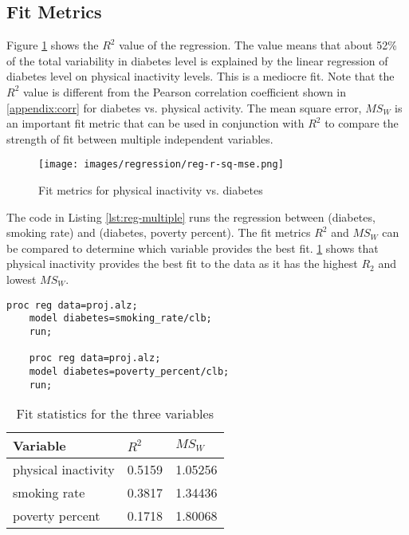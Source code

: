 \documentclass{article}
\begin{document}
\subsection{Fit Metrics}
Figure \ref{fig:reg-r-sq} shows the $R^2$ value of the regression. The value means that about 52\% of the total variability in diabetes level is explained by the linear regression of diabetes level on physical inactivity levels. This is a mediocre fit. Note that the $R^2$ value is different from the Pearson correlation coefficient shown in \ref{appendix:corr} for diabetes vs. physical activity. The mean square error, $MS_W$ is an important fit metric that can be used in conjunction with $R^2$ to compare the strength of fit between multiple independent variables.

\begin{figure}[ht]
    \centering
    \texttt{[image: images/regression/reg-r-sq-mse.png]}
    \caption{Fit metrics for physical inactivity vs. diabetes}
    \label{fig:reg-r-sq}
\end{figure}

The code in Listing \ref{lst:reg-multiple} runs the regression between (diabetes, smoking rate) and (diabetes, poverty percent). The fit metrics $R^2$ and $MS_W$ can be compared to determine which variable provides the best fit. \ref{tab:reg-multiple} shows that physical inactivity provides the best fit to the data as it has the highest $R_2$ and lowest $MS_W$. 

\begin{lstlisting}[language=SAS,caption=Linear regression SAS program for additional variables,captionpos=b,label=lst:reg-multiple]
    proc reg data=proj.alz;
    model diabetes=smoking_rate/clb;
    run;
    
    proc reg data=proj.alz;
    model diabetes=poverty_percent/clb;
    run;
\end{lstlisting}


\begin{table}[ht]
    \centering
    \begin{tabular}{|l|l|l|}
    \hline
         Variable & $R^2$  & $MS_W$ \\
         \hline
         physical inactivity& 0.5159  & 1.05256 \\
         \hline
         smoking rate & 	0.3817  & 1.34436 \\
         \hline
         poverty percent & 0.1718  & 1.80068 \\
         \hline
    \end{tabular}
    \caption{Fit statistics for the three variables}
    \label{tab:reg-multiple}
\end{table}
\end{document}
